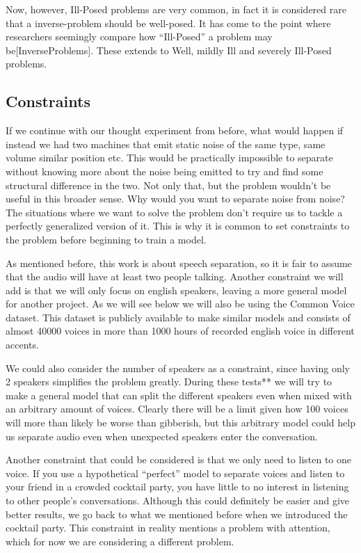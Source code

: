 \documentclass{book}
\begin{document}
Now, however, Ill-Posed problems are very common, in fact it is considered rare that a inverse-problem should be well-posed.
It has come to the point where researchers seemingly compare how “Ill-Posed” a problem may be[InverseProblems].
These extends to Well, mildly Ill and severely Ill-Posed problems.

\subsection{Constraints}
\qquad If we continue with our thought experiment from before, what would happen if instead we had two machines that emit static noise of the same type, same volume similar position etc.
This would be practically impossible to separate without knowing more about the noise being emitted to try and find some structural difference in the two.
Not only that, but the problem wouldn’t be useful in this broader sense.
Why would you want to separate noise from noise? The situations where we want to solve the problem don’t require us to tackle a perfectly generalized version of it.
This is why it is common to set constraints to the problem before beginning to train a model.
\par
As mentioned before, this work is about speech separation, so it is fair to assume that the audio will have at least two people talking.
Another constraint we will add is that we will only focus on english speakers, leaving a more general model for another project.
As we will see below we will also be using the Common Voice dataset.
This dataset is publicly available to make similar models and consists of almost 40000 voices in more than 1000 hours of recorded english voice in different accents.
\par
We could also consider the number of speakers as a constraint, since having only 2 speakers simplifies the problem greatly.
During these tests** we will try to make a general model that can split the different speakers even when mixed with an arbitrary amount of voices.
Clearly there will be a limit given how 100 voices will more than likely be worse than gibberish, but this arbitrary model could help us separate audio even when unexpected speakers enter the conversation.
\par
Another constraint that could be considered is that we only need to listen to one voice.
If you use a hypothetical “perfect” model to separate voices and listen to your friend in a crowded cocktail party, you have little to no interest in listening to other people's conversations.
Although this could definitely be easier and give better results, we go back to what we mentioned before when we introduced the cocktail party.
This constraint in reality mentions a problem with attention, which for now we are considering a different problem.
\end{document}
